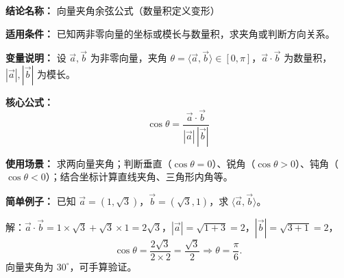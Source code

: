 \textbf{结论名称：} 向量夹角余弦公式（数量积定义变形）

\textbf{适用条件：} 已知两非零向量的坐标或模长与数量积，求夹角或判断方向关系。

\textbf{变量说明：} 设 \(\vec{a}, \vec{b}\) 为非零向量，夹角 \(\theta = \langle \vec{a}, \vec{b} \rangle \in [0, \pi]\)，\(\vec{a} \cdot \vec{b}\) 为数量积，\(|\vec{a}|, |\vec{b}|\) 为模长。

\textbf{核心公式：}
\[
\boxed{\cos\theta = \frac{\vec{a} \cdot \vec{b}}{|\vec{a}| \, |\vec{b}|}}
\]

\textbf{使用场景：} 求两向量夹角；判断垂直（\(\cos\theta = 0\)）、锐角（\(\cos\theta > 0\)）、钝角（\(\cos\theta < 0\)）；结合坐标计算直线夹角、三角形内角等。

\textbf{简单例子：}
已知 \(\vec{a} = (1, \sqrt{3})\)，\(\vec{b} = (\sqrt{3}, 1)\)，求 \(\langle \vec{a}, \vec{b} \rangle\)。

解：\(\vec{a} \cdot \vec{b} = 1 \times \sqrt{3} + \sqrt{3} \times 1 = 2\sqrt{3}\)，\(|\vec{a}| = \sqrt{1+3} = 2\)，\(|\vec{b}| = \sqrt{3+1} = 2\)，
\[
\cos\theta = \frac{2\sqrt{3}}{2 \times 2} = \frac{\sqrt{3}}{2} \Rightarrow \theta = \frac{\pi}{6}.
\]
向量夹角为 \(30^\circ\)，可手算验证。